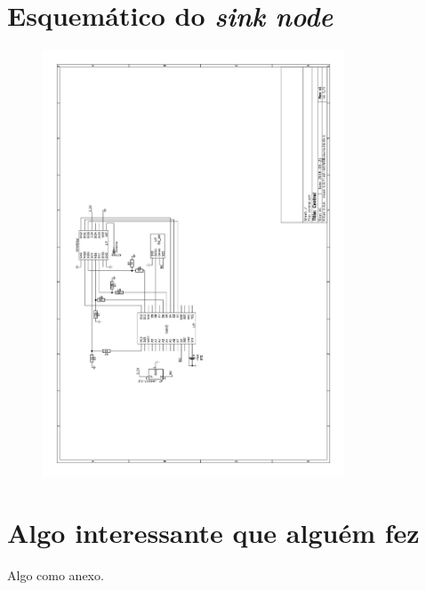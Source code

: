 \documentclass[oneside,openright,12pt]{ufsm_2015} %
\begin{document}
\chapter{Esquemático do \textit{sink node}}
\label{apendice:sink-node-sch}
        \begin{figure}[H]
        \centering
        \includegraphics[width=0.8\textwidth]{figuras/central_sch.png}
        \vspace{\baselineskip} %
\end{figure}

        
        \anexo    %
        
\chapter{Algo interessante que alguém fez}
         \par Algo como anexo.
         
\end{document}
